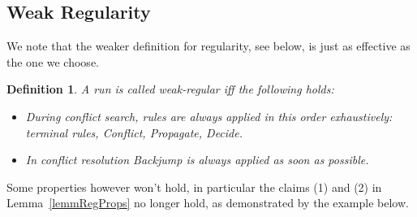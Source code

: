 \documentclass[a4paper]{article}
\newtheorem{defi}{Definition}[section]
\begin{document}
\subsection{Weak Regularity}
We note that the weaker definition for regularity, see below, is just as effective as the one we choose.
\begin{defi}
A \emph{run} is called \emph{weak-regular} iff the following holds:
	\begin{itemize}
		\item During conflict search, rules are always applied in this order exhaustively: terminal rules, \emph{Conflict}, \emph{Propagate}, \emph{Decide}.
		\item In conflict resolution \emph{Backjump} is always applied as soon as possible.
	\end{itemize}
\end{defi}
Some properties however won't hold, in particular the claims (1) and (2) in Lemma~\ref{lemmRegProps} no longer hold, as demonstrated 
by the example below.
\end{document}
